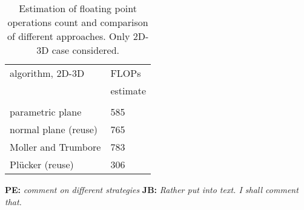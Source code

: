 \documentclass{elsarticle}
\newcommand{\figpath}{figures/}
\newcommand{\noteJB}[1]{{\color{Blue} \textbf{JB: } \textit{#1}}}
\newcommand{\notePE}[1]{{\color{Orange} \textbf{PE: } \textit{#1}}}
\newcommand{\plucker}{Pl\"{u}cker }
\newcommand{\ngh}{NGH }
\begin{document}
%     


\begin{table}[!htb]
    \centering
    \renewcommand{\arraystretch}{1.2}
    \begin{tabular}[b]{l|l}
            algorithm, 2D-3D& FLOPs\\
                      & estimate\\
            \hline\\
            parametric plane & 585\\
            normal plane (reuse) & 765\\
            Moller and Trumbore & 783\\
            Pl\"ucker (reuse) & 306
    \end{tabular}
    \caption{Estimation of floating point operations count and comparison of different approaches.
             Only 2D-3D case considered.}
    \label{tab:fundamental_flops}
    \notePE{comment on different strategies}\noteJB{Rather put into text. I shall comment that.}
\end{table}
\end{document}

